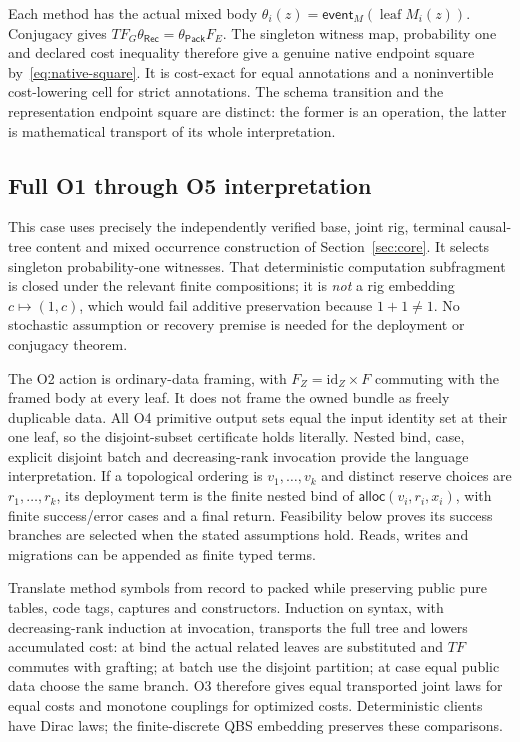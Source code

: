 \documentclass[11pt,a4paper]{article}
\theoremstyle{definition}
\newcommand{\id}{\mathrm{id}}
\newcommand{\leaf}{\operatorname{leaf}}
\begin{document}
Each method has the actual mixed body
$\theta_i(z)=\mathsf{event}_M(\leaf M_i(z))$.
Conjugacy gives $TF_G\theta_{\mathsf{Rec}}=
\theta_{\mathsf{Pack}}F_E$. The singleton witness map, probability one
and declared cost inequality therefore give a genuine native endpoint
square by~\eqref{eq:native-square}. It is cost-exact for equal annotations
and a noninvertible cost-lowering cell for strict annotations. The
schema transition and the representation endpoint square are distinct:
the former is an operation, the latter is mathematical transport of its
whole interpretation.

\subsection{Full O1 through O5 interpretation}
This case uses precisely the independently verified base, joint rig,
terminal causal-tree content and mixed occurrence construction of
Section~\ref{sec:core}. It selects singleton probability-one witnesses.
That deterministic computation subfragment is closed under the relevant
finite compositions; it is \emph{not} a rig embedding $c\mapsto(1,c)$,
which would fail additive preservation because $1+1\ne1$.
No stochastic assumption or recovery premise is needed for the deployment
or conjugacy theorem.

The O2 action is ordinary-data framing, with
$F_Z=\id_Z\times F$ commuting with the framed body at every leaf.
It does not frame the owned bundle as freely duplicable data. All O4
primitive output sets equal the input identity set at their one leaf,
so the disjoint-subset certificate holds literally. Nested bind, case,
explicit disjoint batch and decreasing-rank invocation provide the
language interpretation. If a topological ordering is $v_1,\ldots,v_k$
and distinct reserve choices are $r_1,\ldots,r_k$, its deployment term
is the finite nested bind of
$\mathsf{alloc}(v_i,r_i,x_i)$, with finite success/error cases and a final
return. Feasibility below proves its success branches are selected when
the stated assumptions hold. Reads, writes and migrations can be appended
as finite typed terms.

Translate method symbols from record to packed while preserving public
pure tables, code tags, captures and constructors. Induction on syntax,
with decreasing-rank induction at invocation, transports the full tree
and lowers accumulated cost: at bind the actual related leaves are
substituted and $TF$ commutes with grafting; at batch use the disjoint
partition; at case equal public data choose the same branch. O3 therefore
gives equal transported joint laws for equal costs and monotone
couplings for optimized costs. Deterministic clients have Dirac laws;
the finite-discrete QBS embedding preserves these comparisons.
\end{document}
